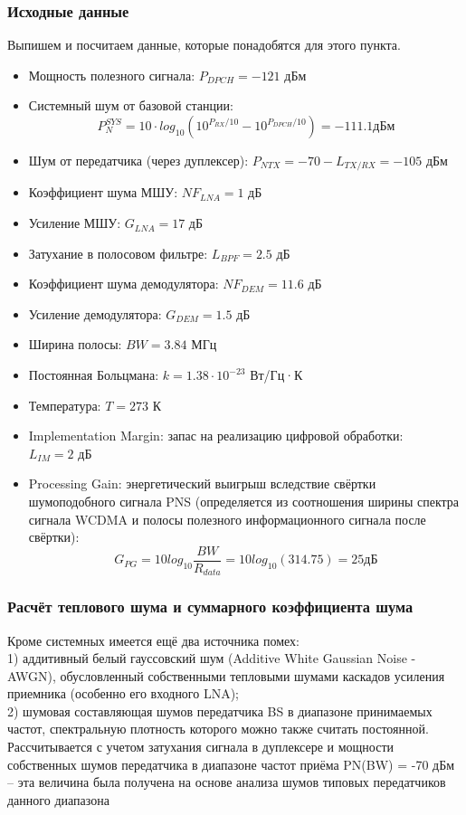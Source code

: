 \documentclass[a4paper,12pt]{article}
\begin{document}
\subsubsection{Исходные данные}
Выпишем и посчитаем данные, которые понадобятся для этого пункта.
\begin{itemize}
\item Мощность полезного сигнала: $P_{DPCH} = -121$ дБм
\item Системный шум от базовой станции:
\begin{equation}
P_{N}^{SYS} = 10 · log_{10}(10^{P_{RX}/10} - 10^{P_{DPCH}/10})= -111.1 \text{дБм}
\end{equation}
\item Шум от передатчика (через дуплексер): $P_{NTX} = -70 - L_{TX/RX} = -105$ дБм
\item Коэффициент шума МШУ: $NF_{LNA} = 1$ дБ
\item Усиление МШУ: $G_{LNA} = 17$ дБ
\item Затухание в полосовом фильтре: $L_{BPF} = 2.5$ дБ
\item Коэффициент шума демодулятора: $NF_{DEM} = 11.6$ дБ
\item Усиление демодулятора: $G_{DEM} = 1.5$ дБ
\item Ширина полосы: $BW = 3.84$ МГц 
\item Постоянная Больцмана: $k = 1.38\cdot10^{-23}$ Вт/Гц·К
\item Температура: $T = 273$ К 
\item Implementation Margin: запас на реализацию цифровой обработки:\\ $L_{IM} = 2$ дБ
\item Processing Gain: энергетический выигрыш вследствие свёртки шумоподобного сигнала PNS (определяется из соотношения ширины спектра сигнала WCDMA и полосы полезного информационного сигнала после свёртки): 
\begin{equation}
G_{PG} = 10  log_{10}\frac{BW}{R_{data}} = 10log_{10}(314.75) = 25 \text{дБ}
\end{equation}
\end{itemize}
\subsubsection{Расчёт теплового шума и суммарного коэффициента шума}
Кроме системных имеется ещё два источника помех:  \\
1) аддитивный белый гауссовский шум (Additive White Gaussian Noise - AWGN), обусловленный собственными тепловыми шумами каскадов усиления приемника (особенно его входного LNA);\\
2) шумовая составляющая шумов передатчика BS в диапазоне принимаемых частот, спектральную плотность которого можно также считать постоянной. Рассчитывается с учетом затухания сигнала в дуплексере и мощности собственных шумов передатчика в диапазоне частот приёма PN(BW) = -70 дБм -- эта величина была получена на основе анализа шумов типовых передатчиков данного диапазона\\
\end{document}

